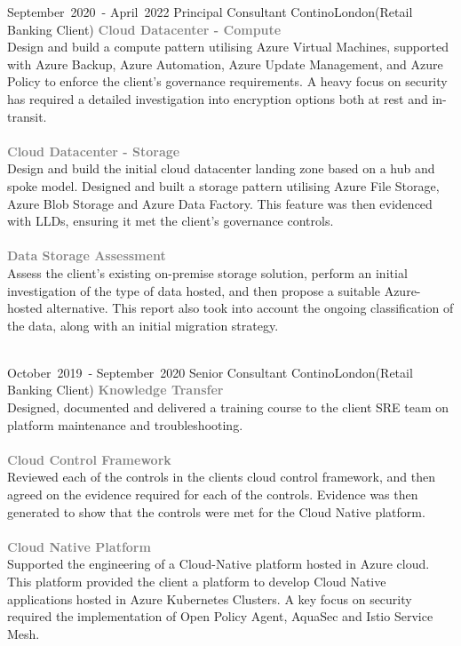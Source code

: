 \cventry %
  {\mbox{September 2020 -} \mbox{April 2022}}
  {Principal Consultant}
  {Contino}{London}{(Retail Banking Client)}
  { 
    \textcolor{gray}{\textbf{Cloud Datacenter - Compute}}\\ 
    Design and build a compute pattern utilising Azure Virtual Machines, 
    supported with Azure Backup, Azure Automation, Azure Update Management,
    and Azure Policy to enforce the client's governance requirements.
    A heavy focus on security has required a detailed investigation into 
    encryption options both at rest and in-transit.\\\\
    \textcolor{gray}{\textbf{Cloud Datacenter - Storage}}\\ 
    Design and build the initial cloud datacenter landing zone based on
    a hub and spoke model. Designed and built a storage pattern utilising
    Azure File Storage, Azure Blob Storage and Azure Data Factory. This 
    feature was then evidenced with LLDs, ensuring it met the client's 
    governance controls.\\\\
    \textcolor{gray}{\textbf{Data Storage Assessment}}\\ 
    Assess the client's existing on-premise storage solution, perform
    an initial investigation of the type of data hosted, and then
    propose a suitable Azure-hosted alternative. This report also took
    into account the ongoing classification of the data, along with 
    an initial migration strategy.\\\\
  }

\cventry %
  {\mbox{October 2019 -} \mbox{September 2020}}
  {Senior Consultant}
  {Contino}{London}{(Retail Banking Client)}
  {
    \textcolor{gray}{\textbf{Knowledge Transfer}}\\
    Designed, documented and delivered a training course
    to the client SRE team on platform maintenance and troubleshooting.\\\\
    \textcolor{gray}{\textbf{Cloud Control Framework}}\\
    Reviewed each of the controls in the clients cloud control framework, 
    and then agreed on the evidence required for each of the controls. 
    Evidence was then generated to show that the controls were met for the 
    Cloud Native platform.\\\\
    \textcolor{gray}{\textbf{Cloud Native Platform}}\\
    Supported the engineering of a Cloud-Native platform hosted in Azure cloud. 
    This platform provided the client a platform to develop Cloud Native applications
    hosted in Azure Kubernetes Clusters. A key focus on security required the implementation
    of Open Policy Agent, AquaSec and Istio Service Mesh.\\
  }

